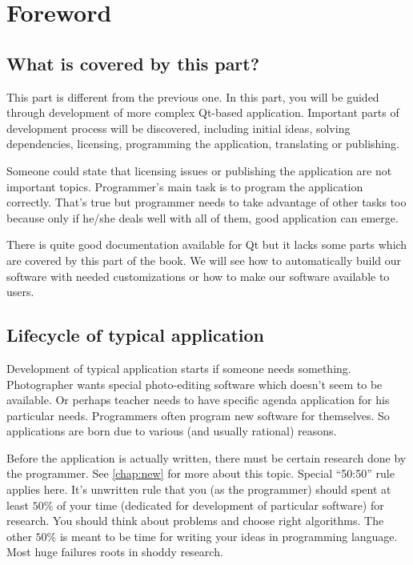 \chapter{Foreword}

\section{What is covered by this part?}
This part is different from the previous one. In this part, you will be guided through development of more complex Qt-based application. Important parts of development process will be discovered, including initial ideas, solving dependencies, licensing, programming the application, translating or publishing.

Someone could state that licensing issues or publishing the application are not important topics. Programmer's main task is to program the application correctly. That's true but programmer needs to take advantage of other tasks too because only if he/she deals well with all of them, good application can emerge.

There is quite good documentation \citep{various:qtdoc} available for Qt but it lacks some parts which are covered by this part of the book. We will see how to automatically build our software with needed customizations or how to make our software available to users.

\section{Lifecycle of typical application}
Development of typical application starts if someone needs something. Photographer wants special photo-editing software which doesn't seem to be available. Or perhaps teacher needs to have specific agenda application for his particular needs. Programmers often program new software for themselves. So applications are born due to various (and usually rational) reasons.

Before the application is actually written, there must be certain research done by the programmer. See \autoref{chap:new} for more about this topic. Special \enquote{50:50} rule applies here. It's unwritten rule that you (as the programmer) should spent at least $50\%$ of your time (dedicated for development of particular software) for research. You should think about problems and choose right algorithms. The other $50\%$ is meant to be time for writing your ideas in programming language. Most huge failures roots in shoddy research.

